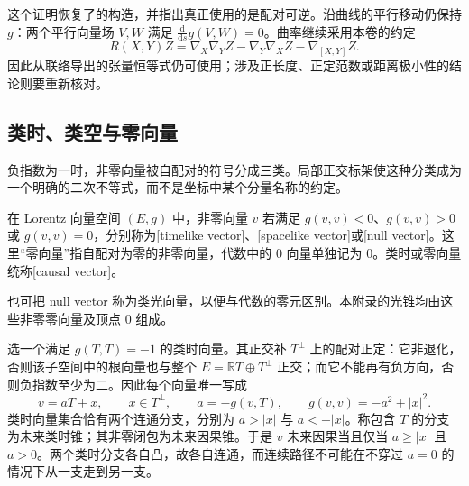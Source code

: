 这个证明恢复了的构造，并指出真正使用的是配对可逆。沿曲线的平行移动仍保持 \(g\)：两个平行向量场 \(V,W\) 满足
\(\frac{\mathrm d}{\mathrm ds}g(V,W)=0\)。曲率继续采用本卷的约定
\[
	R(X,Y)Z=\nabla_X\nabla_YZ-\nabla_Y\nabla_XZ-\nabla_{[X,Y]}Z.
\]
因此从联络导出的张量恒等式仍可使用；涉及正长度、正定范数或距离极小性的结论则要重新核对。

\subsection{类时、类空与零向量}
\label{g3:subsec:A01:02}

负指数为一时，非零向量被自配对的符号分成三类。局部正交标架使这种分类成为一个明确的二次不等式，而不是坐标中某个分量名称的约定。

\begin{definition}\label{g3:def:A-causal-vector-types}
	在 Lorentz 向量空间 \((E,g)\) 中，非零向量 \(v\) 若满足 \(g(v,v)<0\)、\(g(v,v)>0\) 或 \(g(v,v)=0\)，分别称为[timelike vector]、[spacelike vector]或[null vector]。这里“零向量”指自配对为零的非零向量，代数中的 \(0\) 向量单独记为 \(0\)。类时或零向量统称[causal vector]。
\end{definition}

也可把 null vector 称为类光向量，以便与代数的零元区别。本附录的光锥均由这些非零零向量及顶点 \(0\) 组成。

\ProseParagraphBreak
选一个满足 \(g(T,T)=-1\) 的类时向量。其正交补 \(T^\perp\) 上的配对正定：它非退化，否则该子空间中的根向量也与整个 \(E=\mathbb RT\oplus T^\perp\) 正交；而它不能再有负方向，否则负指数至少为二。因此每个向量唯一写成
\[
	v=aT+x,\qquad x\in T^\perp,\qquad
	a=-g(v,T),\qquad g(v,v)=-a^2+|x|^2.
\]
类时向量集合恰有两个连通分支，分别为 \(a>|x|\) 与 \(a<-|x|\)。称包含 \(T\) 的分支为未来类时锥；其非零闭包为未来因果锥。于是 \(v\) 未来因果当且仅当 \(a\ge|x|\) 且 \(a>0\)。两个类时分支各自凸，故各自连通，而连续路径不可能在不穿过 \(a=0\) 的情况下从一支走到另一支。

